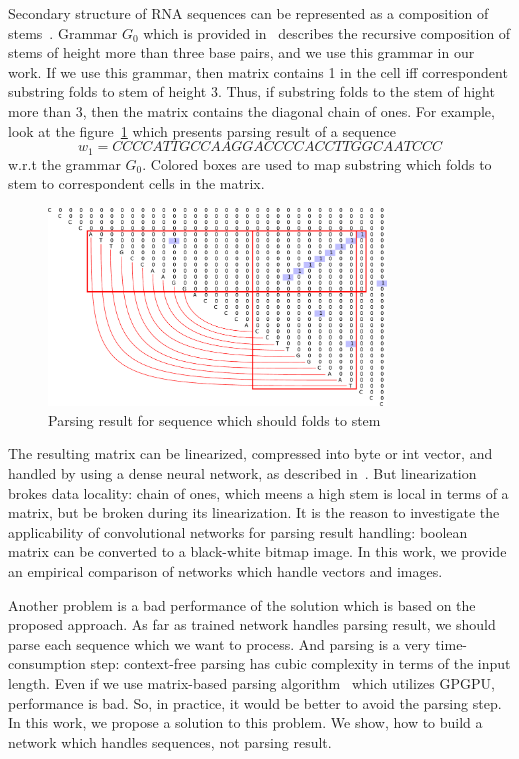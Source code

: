 \documentclass[12pt,a4paper]{cibb}
\begin{document}
Secondary structure of RNA sequences can be represented as a composition of stems~\cite{MQbioinformatics19}.
Grammar $G_0$ which is provided in~\cite{grigorevcomposition} describes the recursive composition of stems of height more than three base pairs, and we use this grammar in our work.
If we use this grammar, then matrix contains 1 in the cell iff correspondent substring folds to stem of height 3.
Thus, if substring folds to the stem of hight more than 3, then the matrix contains the diagonal chain of ones.
For example, look at the figure~\ref{fig:example} which presents parsing result of a sequence
$$
w_1 = CCCCATTGCCAAGGACCCCACCTTGGCAATCCC
$$
w.r.t the grammar $G_0$.
Colored boxes are used to map substring which folds to stem to correspondent cells in the matrix.

\begin{figure}[h]
\begin{center}
\centering
\includegraphics[width=0.8\textwidth]{figures/4.pdf}
\caption{Parsing result for sequence which should folds to
stem}
\label{fig:example}
\end{center}
\end{figure}

The resulting matrix can be linearized, compressed into byte or int vector, and handled by using a dense neural network, as described in~\cite{grigorevcomposition}.
But linearization brokes data locality: chain of ones, which meens a high stem is local in terms of a matrix, but be broken during its linearization.
It is the reason to investigate the applicability of convolutional networks for parsing result handling: boolean matrix can be converted to a black-white bitmap image.
In this work, we provide an empirical comparison of networks which handle vectors and images.

Another problem is a bad performance of the solution which is based on the proposed approach.
As far as trained network handles parsing result, we should parse each sequence which we want to process.
And parsing is a very time-consumption step: context-free parsing has cubic complexity in terms of the input length.
Even if we use matrix-based parsing algorithm~\cite{Azimov:2018:CPQ:3210259.3210264} which utilizes GPGPU, performance is bad.
So, in practice, it would be better to avoid the parsing step.
In this work, we propose a solution to this problem.
We show, how to build a network which handles sequences, not parsing result.
\end{document}

